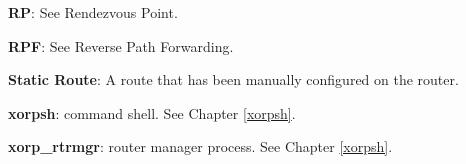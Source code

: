 \begin{description}
  \item{\bf RP}: See Rendezvous Point.

  \item{\bf RPF}: See Reverse Path Forwarding.

  \item{\bf Static Route}: A route that has been manually configured on
  the router.

  \item{\bf xorpsh}: \xorp command shell.  See Chapter \ref{xorpsh}.

  \item{\bf xorp\_rtrmgr}: \xorp router manager process.  See Chapter
  \ref{xorpsh}.

\end{description}
